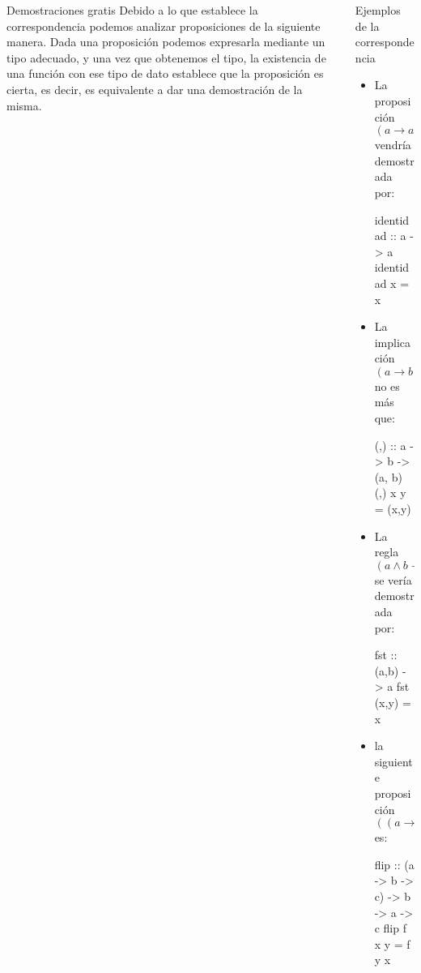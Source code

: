 \documentclass[final]{beamer}
\newlength{\onecolwid}
\newlength{\twocolwid}
\begin{document}
\begin{frame}[t,fragile]
\begin{columns}[t]
\begin{column}{\twocolwid}
\begin{columns}[t,totalwidth=\twocolwid]
\begin{column}{\onecolwid}
  \begin{block}{Demostraciones gratis}
    Debido a lo que establece la correspondencia podemos analizar
    proposiciones de la siguiente manera. Dada una proposición
    podemos expresarla mediante un tipo adecuado, y una vez que obtenemos
    el tipo, la existencia de una función con ese tipo de dato establece
    que la proposición es cierta, es decir, es equivalente a dar una
    demostración de la misma.
    
  \end{block}
  

\end{column} %

\begin{column}{\onecolwid}\vspace{-.6in} %


  \begin{block}{Ejemplos de la correspondencia}
    \begin{itemize}
    \item La proposición $(a \rightarrow a)$ vendría demostrada por:
    \begin{code}
    identidad :: a -> a
    identidad x = x
  \end{code}
\item  La implicación $(a \rightarrow b \rightarrow a \wedge b)$ no es más que:
  \begin{code}
 (,) :: a -> b -> (a, b)
 (,) x y = (x,y) 
\end{code}
\item La regla $(a \wedge b \rightarrow a)$ se vería demostrada por:
  \begin{code}
fst :: (a,b) -> a
fst (x,y) = x
\end{code}
\item la siguiente proposición $((a \rightarrow b \rightarrow c) \rightarrow (b \rightarrow a \rightarrow c) )$ es:
  \begin{code}
flip :: (a -> b -> c) -> b -> a -> c
flip f x y = f y x  
\end{code}

    \end{itemize}
  \end{block}
  


\end{column}
\end{columns}
\end{column}
\end{columns}
\end{frame}
\end{document}
